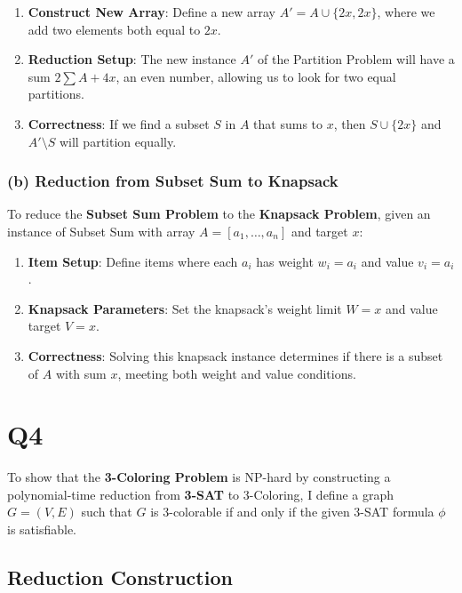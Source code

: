 \documentclass[11pt]{article}
\begin{document}
\begin{enumerate}
    \item \textbf{Construct New Array}: Define a new array \( A' = A \cup \{2x, 2x\} \), where we add two elements both equal to \( 2x \).
    \item \textbf{Reduction Setup}: The new instance \( A' \) of the Partition Problem will have a sum \( 2 \sum A + 4x \), an even number, allowing us to look for two equal partitions.
    \item \textbf{Correctness}: If we find a subset \( S \) in \( A \) that sums to \( x \), then \( S \cup \{2x\} \) and \( A' \setminus S \) will partition equally.
\end{enumerate}

\subsubsection*{(b) Reduction from Subset Sum to Knapsack}

To reduce the \textbf{Subset Sum Problem} to the \textbf{Knapsack Problem}, given an instance of Subset Sum with array \( A = [a_1, \dots, a_n] \) and target \( x \):

\begin{enumerate}
    \item \textbf{Item Setup}: Define items where each \( a_i \) has weight \( w_i = a_i \) and value \( v_i = a_i \).
    \item \textbf{Knapsack Parameters}: Set the knapsack's weight limit \( W = x \) and value target \( V = x \).
    \item \textbf{Correctness}: Solving this knapsack instance determines if there is a subset of \( A \) with sum \( x \), meeting both weight and value conditions.
\end{enumerate}

\newpage

\section*{Q4}

To show that the \textbf{3-Coloring Problem} is NP-hard by constructing a polynomial-time reduction from \textbf{3-SAT} to 3-Coloring, I define a graph \( G = (V, E) \) such that \( G \) is 3-colorable if and only if the given 3-SAT formula \( \phi \) is satisfiable.

\subsection*{Reduction Construction}
\end{document}

